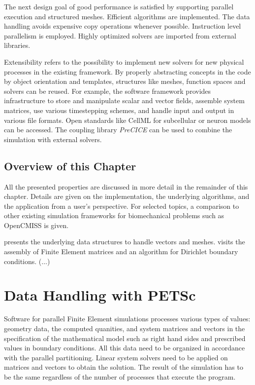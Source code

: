 The next design goal of good performance is satisfied by supporting parallel execution and structured meshes. Efficient algorithms are implemented. The data handling avoids expensive copy operations whenever possible. Instruction level parallelism is employed. Highly optimized solvers are imported from external libraries.

Extensibility refers to the possibility to implement new solvers for new physical processes in the existing framework. By properly abstracting concepts in the code by object orientation and templates, structures like meshes, function spaces and solvers can be reused.
For example, the software framework provides infrastructure to store and manipulate scalar and vector fields, assemble system matrices, use various timestepping schemes, and handle input and output in various file formats.
Open standards like CellML for subcellular or neuron models can be accessed. The coupling library \emph{PreCICE} can be used to combine the simulation with external solvers.

\subsection{Overview of this Chapter}
All the presented properties are discussed in more detail in the remainder of this chapter.
Details are given on the implementation, the underlying algorithms, and the application from a user's perspective. For selected topics, a comparison to other existing simulation frameworks for biomechanical problems such as OpenCMISS is given.

 presents the underlying data structures to handle vectors and meshes.  visits the assembly of Finite Element matrices and an algorithm for Dirichlet boundary conditions. ($\dots$)

\section{Data Handling with PETSc}\label{sec:data_handling_with_petsc}

Software for parallel Finite Element simulations processes various types of values: geometry data, the computed quanities, and system matrices and vectors in the specification of the mathematical model such as right hand sides and prescribed values in boundary conditions.
All this data need to be organized in accordance with the parallel partitioning. Linear system solvers need to be applied on matrices and vectors to obtain the solution.
The result of the simulation has to be the same regardless of the number of processes that execute the program.

